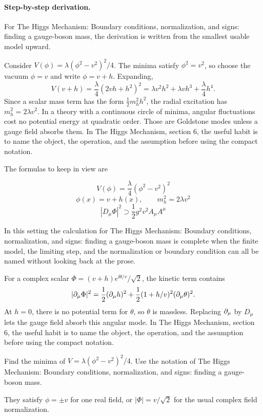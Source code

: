 \paragraph{Step-by-step derivation.}

For The Higgs Mechanism: Boundary conditions, normalization, and signs: finding a gauge-boson mass, the derivation is written from the smallest usable model upward.

Consider \(V(\phi)=\lambda(\phi^2-v^2)^2/4\).  The minima satisfy \(\phi^2=v^2\), so choose the vacuum \(\phi=v\) and write \(\phi=v+h\).  Expanding,
\[
  V(v+h)=\frac{\lambda}{4}(2vh+h^2)^2
  =\lambda v^2h^2+\lambda vh^3+\frac{\lambda}{4}h^4.
\]
Since a scalar mass term has the form \(\frac12m_h^2h^2\), the radial excitation has \(m_h^2=2\lambda v^2\).  In a theory with a continuous circle of minima, angular fluctuations cost no potential energy at quadratic order.  Those are Goldstone modes unless a gauge field absorbs them.  In The Higgs Mechanism, section 6, the useful habit is to name the object, the operation, and the assumption before using the compact notation.

The formulas to keep in view are

\[
  V(\phi)=\frac{\lambda}{4}(\phi^2-v^2)^2
\]
\[
  \phi(x)=v+h(x),\qquad m_h^2=2\lambda v^2
\]
\[
  |D_\mu\Phi|^2\supset \frac12g^2v^2A_\mu A^\mu
\]

In this setting the calculation for The Higgs Mechanism: Boundary conditions, normalization, and signs: finding a gauge-boson mass is complete when the finite model, the limiting step, and the normalization or boundary condition can all be named without looking back at the prose.




\begin{example}
For a complex scalar \(\Phi=(v+h)e^{\ii\theta/v}/\sqrt2\), the kinetic term contains
\[
  |\partial_\mu\Phi|^2=\frac12(\partial_\mu h)^2+\frac12(1+h/v)^2(\partial_\mu\theta)^2.
\]
At \(h=0\), there is no potential term for \(\theta\), so \(\theta\) is massless.  Replacing \(\partial_\mu\) by \(D_\mu\) lets the gauge field absorb this angular mode.  In The Higgs Mechanism, section 6, the useful habit is to name the object, the operation, and the assumption before using the compact notation.
\end{example}



\begin{exercise}
Find the minima of \(V=\lambda(\phi^2-v^2)^2/4\).  Use the notation of The Higgs Mechanism: Boundary conditions, normalization, and signs: finding a gauge-boson mass.
\begin{answer}
They satisfy \(\phi=\pm v\) for one real field, or \(|\Phi|=v/\sqrt2\) for the usual complex field normalization.
\end{answer}
\end{exercise}

